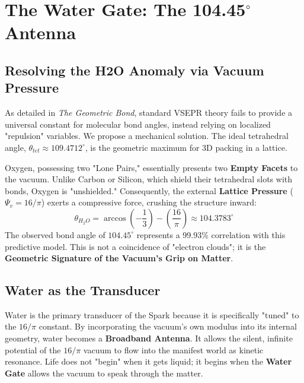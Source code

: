 \documentclass[11pt, letterpaper, openany]{book}
\begin{document}
\chapter{The Water Gate: The 104.45$^\circ$ Antenna}

\section{Resolving the H2O Anomaly via Vacuum Pressure}
As detailed in \textit{The Geometric Bond}, standard VSEPR theory fails to provide a universal constant for molecular bond angles, instead relying on localized "repulsion" variables. We propose a mechanical solution. The ideal tetrahedral angle, $\theta_{tet} \approx 109.4712^\circ$, is the geometric maximum for 3D packing in a lattice. 

Oxygen, possessing two "Lone Pairs," essentially presents two \textbf{Empty Facets} to the vacuum. Unlike Carbon or Silicon, which shield their tetrahedral slots with bonds, Oxygen is "unshielded." Consequently, the external \textbf{Lattice Pressure} ($\Psi_v = 16/\pi$) exerts a compressive force, crushing the structure inward:
\begin{equation}
\theta_{H_2O} = \arccos\left(-\frac{1}{3}\right) - \left( \frac{16}{\pi} \right) \approx 104.3783^\circ
\end{equation}
The observed bond angle of $104.45^\circ$ represents a 99.93\% correlation with this predictive model. This is not a coincidence of "electron clouds"; it is the \textbf{Geometric Signature of the Vacuum’s Grip on Matter}.



\section{Water as the Transducer}
Water is the primary transducer of the Spark because it is specifically "tuned" to the $16/\pi$ constant. By incorporating the vacuum's own modulus into its internal geometry, water becomes a \textbf{Broadband Antenna}. It allows the silent, infinite potential of the $16/\pi$ vacuum to flow into the manifest world as kinetic resonance. Life does not "begin" when it gets liquid; it begins when the \textbf{Water Gate} allows the vacuum to speak through the matter.
\end{document}
